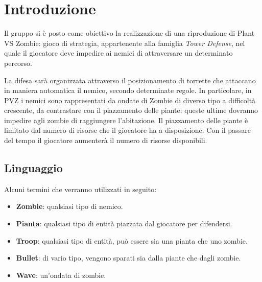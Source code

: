 \newpage
\section{Introduzione}
Il gruppo si è posto come obiettivo la realizzazione di una riproduzione di Plant VS Zombie:
gioco di strategia, appartenente alla famiglia \textit{Tower Defense}, nel quale il giocatore deve impedire ai nemici di attraversare un determinato percorso.

La difesa sarà organizzata attraverso il
posizionamento di torrette che attaccano in maniera automatica il nemico, secondo determinate regole.
In particolare, in PVZ i nemici sono rappresentati da ondate di Zombie di diverso tipo a difficoltà crescente,
da contrastare con il piazzamento delle piante: queste ultime dovranno impedire agli zombie di raggiungere l'abitazione.
Il piazzamento delle piante è limitato dal numero di risorse che il giocatore ha a disposizione.
Con il passare del tempo il giocatore aumenterà il numero di risorse disponibili.

\subsection{Linguaggio}
Alcuni termini che verranno utilizzati in seguito:
\begin{itemize}
    \item \textbf{Zombie}: qualsiasi tipo di nemico.
    \item \textbf{Pianta}: qualsiasi tipo di entità piazzata dal giocatore per difendersi.
    \item \textbf{Troop}: qualsiasi tipo di entità, può essere sia una pianta che uno zombie.
    \item \textbf{Bullet}: di vario tipo, vengono sparati sia dalla piante che dagli zombie.
    \item \textbf{Wave}: un'ondata di zombie.
\end{itemize}
